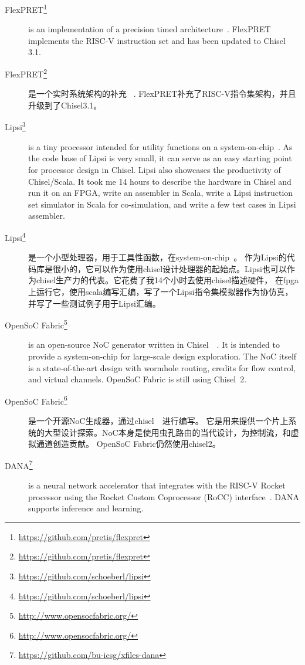 \documentclass[%
    10pt,
    headinclude, footexclude,
    openright, %
    notitlepage,
    cleardoubleempty,
    headsepline,
    pointlessnumbers,
    bibtotoc, idxtotoc,
    ]{scrbook}
\newcommand{\myref}[2]{\href{#1}{#2}}
\renewcommand{\myref}[2]{{#2}{\footnote{\url{#1}}}}
\begin{document}
{\begin{description}
\item[\myref{https://github.com/pretis/flexpret}{FlexPRET}] is an implementation of a
precision timed architecture~\cite{Zimmer:EECS-2015-181}. FlexPRET implements
the RISC-V instruction set and has been updated to Chisel 3.1.

\item[\myref{https://github.com/pretis/flexpret}{FlexPRET}] 是一个实时系统架构的补充
~\cite{Zimmer:EECS-2015-181}. FlexPRET补充了RISC-V指令集架构，并且升级到了Chisel3.1。

\item[\myref{https://github.com/schoeberl/lipsi}{Lipsi}] is a tiny processor intended
for utility functions on a system-on-chip~\cite{lipsi:arcs2018}. As the code base of
Lipsi is very small, it can serve as an easy starting point for processor design in Chisel.
Lipsi also showcases the productivity of Chisel/Scala. It took me 14 hours to describe the
hardware in Chisel and run it on an FPGA, write an assembler in Scala, write a
Lipsi instruction set simulator in Scala for co-simulation, and write a few test cases
in Lipsi assembler.

\item[\myref{https://github.com/schoeberl/lipsi}{Lipsi}]是一个小型处理器，用于工具性函数，在system-on-chip~\cite{lipsi:arcs2018}。
作为Lipsi的代码库是很小的，它可以作为使用chisel设计处理器的起始点。Lipsi也可以作为chisel生产力的代表。它花费了我14个小时去使用chisel描述硬件，
在fpga上运行它，使用scala编写汇编，写了一个Lipsi指令集模拟器作为协仿真，并写了一些测试例子用于Lipsi汇编。

\item[\myref{http://www.opensocfabric.org/}{OpenSoC Fabric}] is an open-source NoC
generator written in Chisel~~\cite{OpenSoC:ispass2016}. It is intended to provide a
system-on-chip for large-scale design exploration. The NoC itself is a state-of-the-art design with wormhole routing, credits for flow control, and virtual channels.
OpenSoC Fabric is still using Chisel~2.

\item[\myref{http://www.opensocfabric.org/}{OpenSoC Fabric}] 是一个开源NoC生成器，通过chisel~~\cite{OpenSoC:ispass2016}进行编写。
它是用来提供一个片上系统的大型设计探索。NoC本身是使用虫孔路由的当代设计，为控制流，和虚拟通道创造贡献。
OpenSoC Fabric仍然使用chisel2。


\item[\myref{https://github.com/bu-icsg/xfiles-dana}{DANA}] is a neural network accelerator
that integrates with the RISC-V Rocket processor using the Rocket Custom Coprocessor (RoCC) interface~\cite{RoCC:2015}.
DANA supports inference and learning.


\end{description}}
\end{document}
